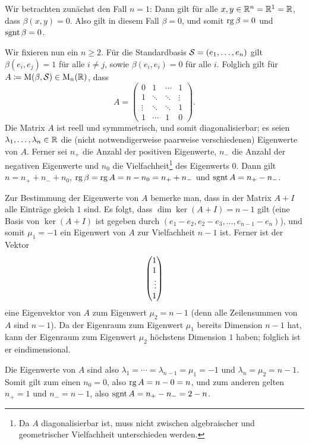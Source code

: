 \section{}

Wir betrachten zunächst den Fall $n = 1$:
Dann gilt für alle $x, y \in \mathbb{R}^n = \mathbb{R}^1 = \mathbb{R}$, dass $\beta(x,y) = 0$.
Also gilt in diesem Fall $\beta = 0$, und somit $\operatorname{rg} \beta = 0$ und $\operatorname{sgnt} \beta = 0$.

Wir fixieren nun ein $n \geq 2$.
Für die Standardbasis $\mathcal{S} = (e_1, \dotsc, e_n)$ gilt $\beta(e_i, e_j) = 1$ für alle $i \neq j$, sowie $\beta(e_i, e_i) = 0$ für alle $i$.
Folglich gilt für $A \coloneqq \operatorname{M}(\beta, \mathcal{S}) \in \operatorname{M}_{n}(\mathbb{R})$, dass
\[
    A
  = \begin{pmatrix}
      0       & 1       & \cdots  & 1       \\
      1       & \ddots  & \ddots  & \vdots  \\
      \vdots  & \ddots  & \ddots  & 1       \\
      1       & \cdots  & 1       & 0
    \end{pmatrix}.
\]
Die Matrix $A$ ist reell und symmmetrisch, und somit diagonalisierbar;
es seien $\lambda_1, \dotsc, \lambda_n \in \mathbb{R}$ die (nicht notwendigerweise paarweise verschiedenen) Eigenwerte von $A$.
Ferner sei $n_+$ die Anzahl der positiven Eigenwerte, $n_-$ die Anzahl der negativen Eigenwerte und $n_0$ die Vielfachheit\footnote{Da $A$ diagonalisierbar ist, muss nicht zwischen algebraischer und geometrischer Vielfachheit unterschieden werden.} des Eigenwerts $0$.
Dann gilt $n = n_+ + n_- + n_0$, $\operatorname{rg} \beta = \operatorname{rg} A = n - n_0 = n_+ + n_-$ und $\operatorname{sgnt} A = n_+ - n_-$.

Zur Bestimmung der Eigenwerte von $A$ bemerke man, dass in der Matrix $A + I$ alle Einträge gleich $1$ sind.
Es folgt, dass $\dim \ker (A + I) = n - 1$ gilt (eine Basis von $\ker (A + I)$ ist gegeben durch $(e_1 - e_2, e_2 - e_3, \dotsc, e_{n-1} - e_n)$), und somit $\mu_1 = -1$ ein Eigenwert von $A$ zur Vielfachheit $n-1$ ist.
Ferner ist der Vektor
\[
  \vect{1 \\ 1 \\ \vdots \\ 1}
\]
eine Eigenvektor von $A$ zum Eigenwert $\mu_2 = n-1$ (denn alle Zeilensummen von $A$ sind $n-1$).
Da der Eigenraum zum Eigenwert $\mu_1$ bereits Dimension $n-1$ hat, kann der Eigenraum zum Eigenwert $\mu_2$ höchstens Dimension $1$ haben;
folglich ist er eindimensional.

Die Eigenwerte von $A$ sind also $\lambda_1 = \dotsb = \lambda_{n-1} = \mu_1 = -1$ und $\lambda_n = \mu_2 = n-1$.
Somit gilt zum einen $n_0 = 0$, also $\operatorname{rg} A = n - 0 = n$, und zum anderen gelten $n_+ = 1$ und $n_- = n-1$, also $\operatorname{sgnt} A = n_+ - n_- = 2 - n$.
